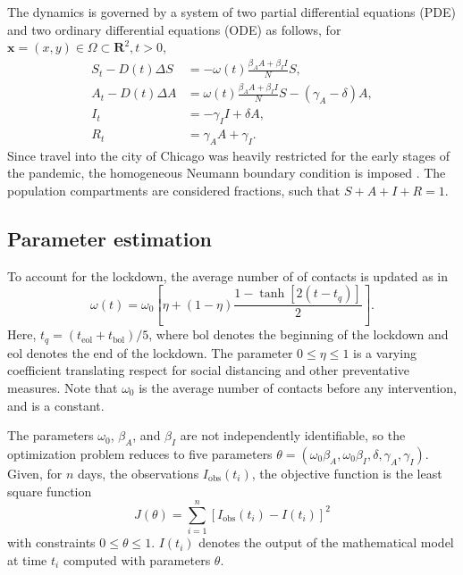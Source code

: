 \documentclass[11pt]{article}
\newcommand{\R}{\mathbf{R}}
\renewcommand\vec{\mathbf}
\begin{document}
		The dynamics is governed by a system of two partial differential equations (PDE) and two ordinary differential equations (ODE) as follows, for $\vec{x} = (x,y) \in \Omega \subset \R^2, t > 0$,
		\begin{equation} \label{eq:model}
			\begin{aligned}
				S_t - D(t) \Delta S &= - \omega(t) \frac{\beta_A A + \beta_I I}{N} S, \\
				A_t - D(t) \Delta A &= \omega(t) \frac{\beta_A A + \beta_I I}{N} S - (\gamma_A - \delta) A, \\
				I_t &= - \gamma_I I + \delta A, \\
				R_t &= \gamma_A A + \gamma_I.
			\end{aligned}
		\end{equation}
		Since travel into the city of Chicago was heavily restricted for the early stages of the pandemic, the homogeneous Neumann boundary condition is imposed \cite{Mammeri+2020+102+113}.
		The population compartments are considered fractions, such that $S + A + I + R = 1$.
	
	\subsection{Parameter estimation}
		To account for the lockdown, the average number of of contacts is updated as in  \cite{Kevrekidis-2021}
		\begin{equation} \label{eq:contacts}
			\omega (t) = \omega_0 \left[ \eta + (1 - \eta) \frac{1 - \tanh \left[2 (t - t_q) \right]}{2} \right].
		\end{equation}
		Here, $t_q = (t_{\mathrm{eol}} + t_{\mathrm{bol}}) / 5$, where $\mathrm{bol}$ denotes the beginning of the lockdown and $\mathrm{eol}$ denotes the end of the lockdown.
		The parameter $0 \leq \eta \leq 1$ is a varying coefficient translating respect for social distancing and other preventative measures.
		Note that $\omega_0$ is the average number of contacts before any intervention, and is a constant.
		
		The parameters $\omega_0$, $\beta_A$, and $\beta_I$ are not independently identifiable, so the optimization problem reduces to five parameters $\theta = (\omega_0 \beta_A, \omega_0 \beta_I, \delta, \gamma_A, \gamma_I)$.
		Given, for $n$ days, the observations $I_\mathrm{obs} (t_i)$, the objective function is the least square function
		\begin{equation} \label{eq:obj}
			J (\theta) = \sum_{i=1}^n \left[ I_\mathrm{obs} (t_i) - I (t_i) \right]^2
		\end{equation}
		with constraints $0 \leq \theta \leq 1$.
		$I (t_i)$ denotes the output of the mathematical model at time $t_i$ computed with parameters $\theta$.
		
\end{document}

